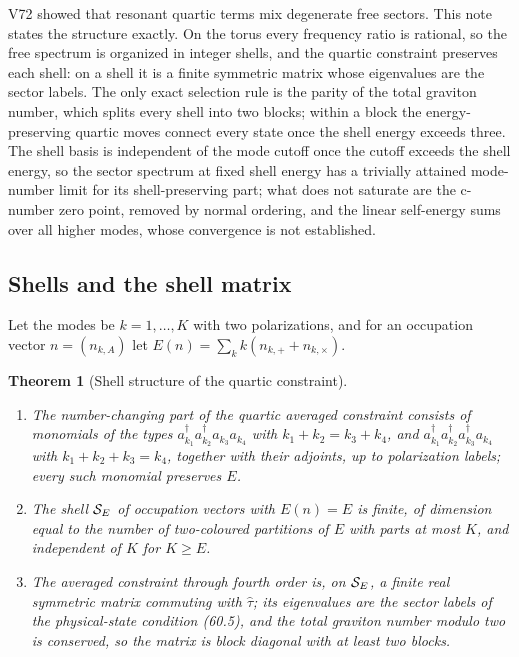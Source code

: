 \documentclass[11pt]{article}
\newtheorem{theorem}{Theorem}[section]
\theoremstyle{remark}
\begin{document}
V72 showed that resonant quartic terms mix degenerate free sectors.
This note states the structure exactly.  On the torus every frequency
ratio is rational, so the free spectrum is organized in integer
shells, and the quartic constraint preserves each shell: on a shell it
is a finite symmetric matrix whose eigenvalues are the sector labels.
The only exact selection rule is the parity of the total graviton
number, which splits every shell into two blocks; within a block the
energy-preserving quartic moves connect every state once the shell
energy exceeds three.  The shell basis is independent of the mode
cutoff once the cutoff exceeds the shell energy, so the sector spectrum
at fixed shell energy has a trivially attained mode-number limit for
its shell-preserving part; what does not saturate are the c-number
zero point, removed by normal ordering, and the linear self-energy
sums over all higher modes, whose convergence is not established.

\subsection{Shells and the shell matrix}

Let the modes be \(k=1,\dots,K\) with two polarizations, and for an
occupation vector \(n=(n_{k,A})\) let \(E(n)=\sum_kk(n_{k,+}+n_{k,\times})\).

\begin{theorem}[Shell structure of the quartic constraint]
\label{thm:v19v73-shell}
\begin{enumerate}
\item The number-changing part of the quartic averaged constraint
      consists of monomials of the types
      \(a^\dagger_{k_1}a^\dagger_{k_2}a_{k_3}a_{k_4}\) with
      \(k_1+k_2=k_3+k_4\), and
      \(a^\dagger_{k_1}a^\dagger_{k_2}a^\dagger_{k_3}a_{k_4}\) with
      \(k_1+k_2+k_3=k_4\), together with their adjoints, up to
      polarization labels; every such monomial preserves \(E\).
\item The shell \({\cal S}_E\) of occupation vectors with \(E(n)=E\) is
      finite, of dimension equal to the number of two-coloured
      partitions of \(E\) with parts at most \(K\), and independent of
      \(K\) for \(K\geq E\).
\item The averaged constraint through fourth order is, on
      \({\cal S}_E\), a finite real symmetric matrix commuting with
      \(\hat\tau\); its eigenvalues are the sector labels of the
      physical-state condition (60.5), and the total graviton number
      modulo two is conserved, so the matrix is block diagonal with at
      least two blocks.
\end{enumerate}
\end{theorem}
\end{document}
